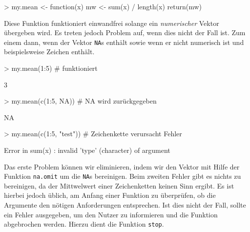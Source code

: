 \documentclass[12pt, a4paper,twoside,openany,x11names,svgnames]{memoir}
\begin{document}
\begin{Schunk}
\begin{Sinput}
> my.mean <- function(x) {
   mw <- sum(x) / length(x)
   return(mw)
 }
\end{Sinput}
\end{Schunk}

Diese Funktion funktioniert einwandfrei solange ein \emph{numerischer} Vektor übergeben wird. Es treten jedoch Problem auf, wenn dies nicht der Fall ist. Zum einem dann, wenn der Vektor \texttt{NA}s enthält sowie wenn er nicht numerisch ist und beispielsweise Zeichen enthält.

\begin{Schunk}
\begin{Sinput}
> my.mean(1:5)                # funktioniert
\end{Sinput}
\begin{Soutput}
[1] 3
\end{Soutput}
\begin{Sinput}
> my.mean(c(1:5, NA))         # NA wird zurückgegeben
\end{Sinput}
\begin{Soutput}
[1] NA
\end{Soutput}
\end{Schunk}
\begin{Schunk}
\begin{Sinput}
> my.mean(c(1:5, "test"))     # Zeichenkette verursacht Fehler
\end{Sinput}
\end{Schunk}
\begin{Schunk}
\begin{Soutput}
Error in sum(x) : invalid 'type' (character) of argument
\end{Soutput}
\end{Schunk}

Das erste Problem können wir eliminieren, indem wir den Vektor mit Hilfe der Funktion \texttt{na.omit} um die \texttt{NA}s bereinigen. Beim zweiten Fehler gibt es nichts zu bereinigen, da der Mittwelwert einer Zeichenketten keinen Sinn ergibt. Es ist hierbei jedoch üblich, am Anfang einer Funktion zu überprüfen, ob die Argumente den nötigen Anforderungen entsprechen. Ist dies nicht der Fall, sollte ein Fehler ausgegeben, um den Nutzer zu informieren und die Funktion abgebrochen werden. Hierzu dient die Funktion \texttt{stop}. 
\end{document}
